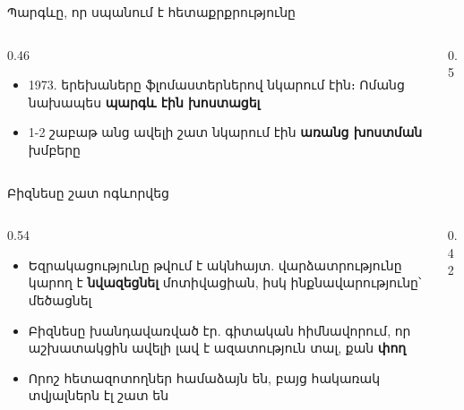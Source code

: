 \begin{frame}{Պարգևը, որ սպանում է հետաքրքրությունը}
  \begin{columns}[c]
    \begin{column}{0.46\textwidth}
      \begin{itemize}
        \item 1973. երեխաները ֆլոմաստերներով նկարում էին։ Ոմանց նախապես \textbf{պարգև էին խոստացել}
        \item<2-> 1-2 շաբաթ անց ավելի շատ նկարում էին \textbf{առանց խոստման} խմբերը
      \end{itemize}
    \end{column}
    \begin{column}{0.5\textwidth}
      \centering
    \end{column}
  \end{columns}
\end{frame}

\begin{frame}{Բիզնեսը շատ ոգևորվեց}
  \begin{columns}[c]
    \begin{column}{0.54\textwidth}
      \begin{itemize}
        \item Եզրակացությունը թվում է ակնհայտ. վարձատրությունը կարող է \textbf{նվազեցնել} մոտիվացիան, իսկ ինքնավարությունը՝ մեծացնել
        \item<2-> Բիզնեսը խանդավառված էր. գիտական հիմնավորում, որ աշխատակցին ավելի լավ է ազատություն տալ, քան \textbf{փող}
        \item<3-> Որոշ հետազոտողներ համաձայն են, բայց հակառակ տվյալներն էլ շատ են
      \end{itemize}
    \end{column}
    \begin{column}{0.42\textwidth}
      \centering
    \end{column}
  \end{columns}
\end{frame}

